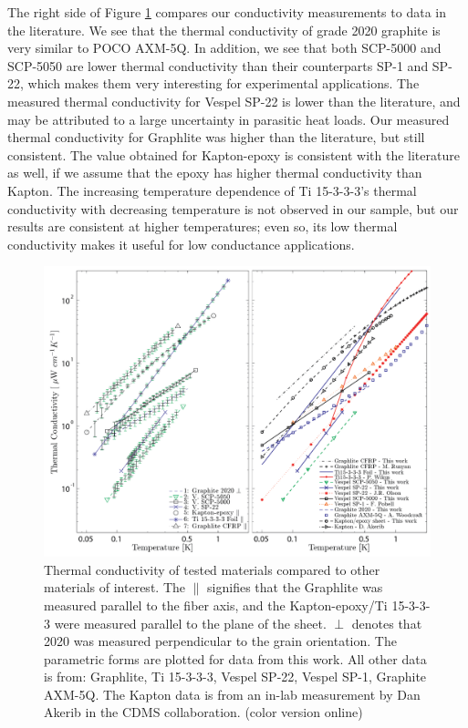 \documentclass[final]{svjour2}
\begin{document}
The right side of Figure \ref{plots} compares our conductivity measurements to data in the literature. We see that the thermal conductivity of grade 2020 graphite is very similar to POCO AXM-5Q. In addition, we see that both SCP-5000 and SCP-5050 are lower thermal conductivity than their counterparts SP-1 and SP-22, which makes them very interesting for experimental applications. The measured thermal conductivity for Vespel SP-22 is lower than the literature, and may be attributed to a large uncertainty in parasitic heat loads. Our measured thermal conductivity for Graphlite was higher than the literature, but still consistent. The value obtained for Kapton-epoxy is consistent with the literature as well, if we assume that the epoxy has higher thermal conductivity than Kapton. The increasing temperature dependence of Ti 15-3-3-3's thermal conductivity with decreasing temperature is not observed in our sample, but our results are consistent at higher temperatures; even so, its low thermal conductivity makes it useful for low conductance applications.

\begin{figure}[h]
\includegraphics[width = \textwidth]{Double_plot_v2.png}
\caption{{\small Thermal conductivity of tested materials compared to other materials of interest. The $\parallel$ signifies that the Graphlite was measured parallel to the fiber axis, and the Kapton-epoxy/Ti 15-3-3-3 were measured parallel to the plane of the sheet. $\perp$ denotes that 2020 was measured perpendicular to the grain orientation. The parametric forms are plotted for data from this work. All other data is from: Graphlite\cite{Runyan2008}, Ti 15-3-3-3\cite{Wikus2010}, Vespel SP-22\cite{Olson1993}, Vespel SP-1\cite{Pobell1992}, Graphite AXM-5Q\cite{Woodcraft2009}. The Kapton data is from an in-lab measurement by Dan Akerib in the CDMS collaboration. (color version online)}}
\label{plots}
\end{figure}
\end{document}
